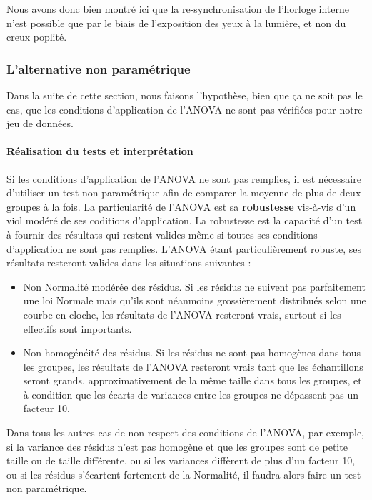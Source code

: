 \documentclass[a4paperpaper,]{article}
\providecommand{\tightlist}{%
  \setlength{\itemsep}{0pt}\setlength{\parskip}{0pt}}
\let\oldparagraph\paragraph
\renewcommand{\paragraph}[1]{\oldparagraph{#1}\mbox{}}
\begin{document}
Nous avons donc bien montré ici que la re-synchronisation de l'horloge interne n'est possible que par le biais de l'exposition des yeux à la lumière, et non du creux poplité.

\hypertarget{lalternative-non-parametrique-3}{%
\subsubsection{L'alternative non paramétrique}\label{lalternative-non-parametrique-3}}

Dans la suite de cette section, nous faisons l'hypothèse, bien que ça ne soit pas le cas, que les conditions d'application de l'ANOVA ne sont pas vérifiées pour notre jeu de données.

\hypertarget{realisation-du-tests-et-interpretation}{%
\paragraph{Réalisation du tests et interprétation}\label{realisation-du-tests-et-interpretation}}

Si les conditions d'application de l'ANOVA ne sont pas remplies, il est nécessaire d'utiliser un test non-paramétrique afin de comparer la moyenne de plus de deux groupes à la fois. La particularité de l'ANOVA est sa \textbf{robustesse} vis-à-vis d'un viol modéré de ses coditions d'application. La robustesse est la capacité d'un test à fournir des résultats qui restent valides même si toutes ses conditions d'application ne sont pas remplies. L'ANOVA étant particulièrement robuste, ses résultats resteront valides dans les situations suivantes :

\begin{itemize}
\tightlist
\item
  Non Normalité modérée des résidus. Si les résidus ne suivent pas parfaitement une loi Normale mais qu'ils sont néanmoins grossièrement distribués selon une courbe en cloche, les résultats de l'ANOVA resteront vrais, surtout si les effectifs sont importants.
\item
  Non homogénéité des résidus. Si les résidus ne sont pas homogènes dans tous les groupes, les résultats de l'ANOVA resteront vrais tant que les échantillons seront grands, approximativement de la même taille dans tous les groupes, et à condition que les écarts de variances entre les groupes ne dépassent pas un facteur 10.
\end{itemize}

Dans tous les autres cas de non respect des conditions de l'ANOVA, par exemple, si la variance des résidus n'est pas homogène et que les groupes sont de petite taille ou de taille différente, ou si les variances diffèrent de plus d'un facteur 10, ou si les résidus s'écartent fortement de la Normalité, il faudra alors faire un test non paramétrique.
\end{document}
